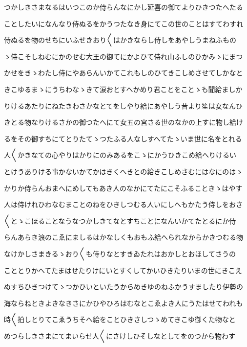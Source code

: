 \documentclass[a4paper,11pt,landscape]{ltjtarticle}
\begin{document}
\par\medskip
つかしきさまなるはいつこのか侍らんなにかし延喜の御てよりひきつたへたる
\par\medskip
ことしたいになんなり侍ぬるをかうつたなき身にてこの世のことはすてわすれ
\par\medskip
侍ぬるを物のせちにいふせきおり〱はかきならし侍しをあやしうまねふもの
\par\medskip
ゝ侍こそしねむにかのせむ大王の御てにかよひて侍れ山ふしのひかみゝにまつ
\par\medskip
かせをきゝわたし侍にやあらんいかてこれもしのひてきこしめさせてしかなと
\par\medskip
きこゆるまゝにうちわなゝきて涙おとすへかめり君ことをことゝも聞給ましか
\par\medskip
りけるあたりにねたきわさかなとてをしやり給にあやしう昔より笙は女なんひ
\par\medskip
きとる物なりけるさかの御つたへにて女五の宮さる世のなかの上すに物し給け
\par\medskip
るをその御すちにてとりたてゝつたふる人なしすへてたゝいま世に名をとれる
\par\medskip
人〱かきなての心やりはかりにのみあるをこゝにかうひきこめ給へりけるい
\par\medskip
とけうありける事かないかてかはきくへきとの給きこしめさむにはなにのはゝ
\par\medskip
かりか侍らんおまへにめしてもあき人のなかにてたにこそふることきゝはやす
\par\medskip
人は侍けれひわなむまことのねをひきしつむる人いにしへもかたう侍しをおさ
\par\medskip
〱とゝこほることなうなつかしきてなとすちことになんいかてたとるにか侍
\par\medskip
らんあらき浪のこゑにましるはかなしくもおもふ給へられなからかきつむる物
\par\medskip
なけかしさまきるゝおり〱も侍りなとすきゐたれはおかしとおほしてさうの
\par\medskip
こととりかへてたまはせたりけにいとすくしてかいひきたりいまの世にきこえ
\par\medskip
ぬすちひきつけてゝつかひいといたうからめきゆのねふかうすましたり伊勢の
\par\medskip
海ならねときよきなきさにかひやひろはむなとこゑよき人にうたはせてわれも
\par\medskip
時〱拍しとりてこゑうちそへ給をことひきさしつゝめてきこゆ御くた物なと
\par\medskip
めつらしきさまにてまいらせ人〱にさけしひそしなとしてをのつから物わす
\par\medskip
\end{document}
